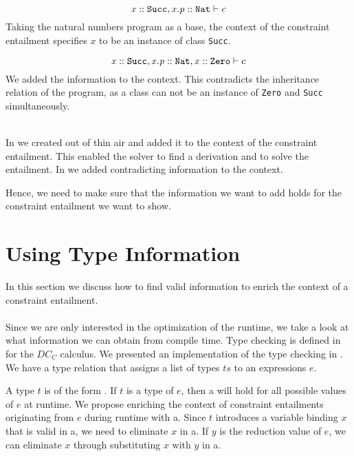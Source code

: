 \begin{example}
\label{ex:enrich-context-contra}\quad\\
\[  \mathit{x} :: \mathit{\texttt{Succ}}, \mathit{x.p} :: \mathit{\texttt{Nat}}  \vdash c \]
Taking the natural numbers program as a base,
the context of the constraint entailment specifies $x$ to be
an instance of class \texttt{Succ}.
        
\[  \mathit{x} :: \mathit{\texttt{Succ}}, \mathit{x.p} :: \mathit{\texttt{Nat}}, \mathit{x} :: \mathit{\texttt{Zero}}  \vdash c \]
We added the information  to the context.
This contradicts the inheritance relation of the program,
as a class can not be an instance of \texttt{Zero} and \texttt{Succ} simultaneously.
\end{example}
\quad\\
%
In 
we created  out of thin air
and added it to the context of the constraint entailment.
This enabled the solver to find a derivation and to solve
the entailment.
In 
we added contradicting information to the context.

Hence, we need to make sure that the information
we want to add holds for the constraint entailment
we want to show.
\newpage

\section{Using Type Information}
In this section we discuss how to find valid
information to enrich the context of a constraint entailment.\\
\\
Since we are only interested in the optimization of the runtime,
we take a look at what information we can obtain from compile time.
Type checking is defined in  for the $DC_C$ calculus.
We presented an implementation of the type checking in .
We have a type relation that assigns a list of types $ts$ to an expressions $e$.

A type $t$ is of the form .
If $t$ is a type of $e$, then \ovl a will hold for all
possible values of $e$ at runtime.
We propose enriching the context of constraint entailments
originating from $e$ during runtime with \ovl a.
Since $t$ introduces a variable binding $x$ that is valid
in \ovl a, we need to eliminate $x$ in \ovl a.
If $y$ is the reduction value of $e$,
we can eliminate $x$ through
substituting $x$ with $y$ in \ovl a.

